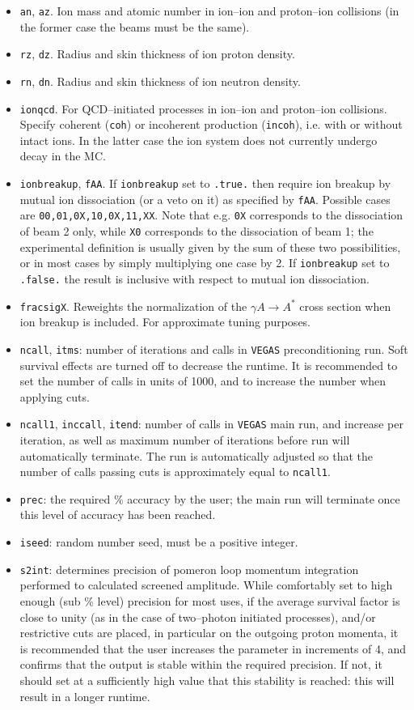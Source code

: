 \documentclass[12pt]{article}
\begin{document}
\begin{itemize}
\item \texttt{an}, \texttt{az}. Ion mass and atomic number in ion--ion and proton--ion collisions (in the former case the beams must be the same).
\item \texttt{rz}, \texttt{dz}. Radius and skin thickness of ion proton density.
\item \texttt{rn}, \texttt{dn}. Radius and skin thickness of ion neutron density.
\item \texttt{ionqcd}. For QCD--initiated processes in ion--ion and proton--ion collisions. Specify coherent (\texttt{coh}) or incoherent production (\texttt{incoh}), i.e. with or without intact ions. In the latter case the ion system does not currently undergo decay in the MC.
\item \texttt{ionbreakup}, \texttt{fAA}. If \texttt{ionbreakup} set to \texttt{.true.} then require ion breakup by mutual ion dissociation (or a veto on it) as specified by \texttt{fAA}. Possible cases are \texttt{00,01,0X,10,0X,11,XX}. Note that e.g. \texttt{0X} corresponds to the dissociation of beam 2 only, while \texttt{X0} corresponds to the dissociation of beam 1; the experimental definition is usually given by the sum of these two possibilities, or in most cases by simply multiplying one case by 2. If \texttt{ionbreakup} set to \texttt{.false.} the result is inclusive with respect to mutual ion dissociation.
\item \texttt{fracsigX}. Reweights the normalization of the $\gamma A \to A^*$ cross section when ion breakup is included. For approximate tuning purposes.
\item \texttt{ncall}, \texttt{itms}: number of iterations and calls in \texttt{VEGAS} preconditioning run. Soft survival effects are turned off to decrease the runtime. It is recommended to set the number of calls in units of 1000, and to increase the number when applying cuts.
\item \texttt{ncall1}, \texttt{inccall}, \texttt{itend}: number of calls in \texttt{VEGAS} main run, and increase per iteration, as well as maximum number of iterations before run will automatically terminate. The run is automatically adjusted so that the number of calls passing cuts is approximately equal to \texttt{ncall1}.
\item  \texttt{prec}: the required \% accuracy by the user; the main run will terminate once this level of accuracy has been reached.
\item \texttt{iseed}: random number seed, must be a positive integer.
\item \texttt{s2int}: determines precision of pomeron loop momentum integration performed to calculated screened amplitude. While comfortably set to high enough (sub \% level) precision for most uses, if the average survival factor is close to unity (as in the case of two--photon initiated processes), and/or restrictive cuts are placed, in particular on the outgoing proton momenta, it is recommended that the user increases the parameter in increments of 4, and confirms that the output is stable within the required precision. If not, it should set at a sufficiently high value that this stability is reached: this will result in a longer runtime.

\end{itemize}
\end{document}
